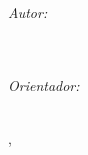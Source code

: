 {%

\begin{minipage}{\textwidth}
\begin{flushleft} \large
\emph{Autor:}\\
\textsc{\myAuthor} \\
\texttt{\myAuthorEmail} \\
\end{flushleft}
\end{minipage}

\begin{minipage}{\textwidth}
\begin{flushright} \large \vspace{0.5cm}
\emph{Orientador:} \\
\textsc{\mySupervisor} \\
\texttt{\mySupervisorEmail}
\end{flushright}
\end{minipage}


\vfill
{\large \myCity, \myDate}
 
}

